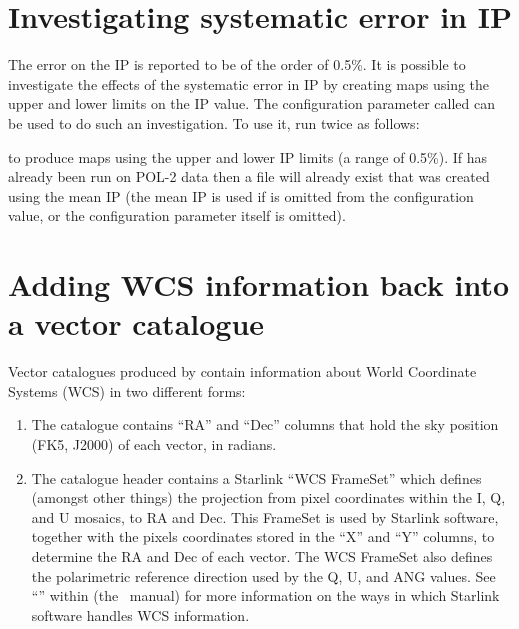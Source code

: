 \section{Investigating systematic error in IP}


The error on the IP is reported to be of the order of 0.5\%.  It is
possible to investigate the effects of the systematic error in IP by
creating maps using the upper and lower limits on the IP value. The
 configuration parameter called 
can be used to do such an
investigation. To use it, run  twice as follows:

\begin{terminalv}
\end{terminalv}

to produce maps using the upper and lower IP limits (a range of
0.5\%). If  has already been run on POL-2 data then a file will
already exist that was created using the mean IP (the mean IP is used
if  is omitted from the configuration value, or the
configuration parameter itself is omitted).



\section{\label{sec:wcscopy}Adding WCS information back into a vector catalogue}
Vector catalogues produced by  contain information about World Coordinate
Systems (WCS) in two different forms:

\begin{enumerate}
\item The catalogue contains ``RA'' and ``Dec'' columns that hold the sky position
(FK5, J2000) of each vector, in radians.
\item The catalogue header contains a Starlink ``WCS FrameSet'' which defines
(amongst other things) the projection from pixel coordinates within the I, Q, and
U mosaics, to RA and Dec. This FrameSet is used by Starlink software, together
with the pixels coordinates stored in the ``X'' and ``Y'' columns, to determine
the RA and Dec of each vector. The WCS FrameSet also defines the polarimetric
reference direction used by the Q, U, and ANG values. See
``''
within  (the \KAPPA\ manual) for more information on
the ways in which Starlink software handles WCS information.
\end{enumerate}

